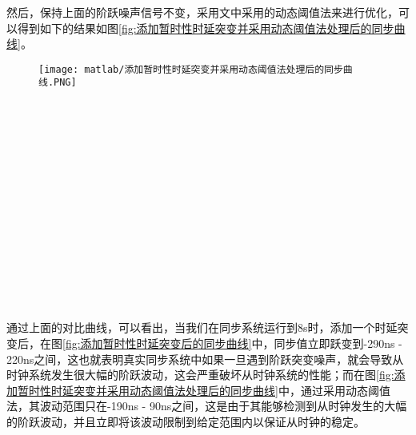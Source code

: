 然后，保持上面的阶跃噪声信号不变，采用文中采用的动态阈值法来进行优化，可以得到如下的结果如图\ref{fig:添加暂时性时延突变并采用动态阈值法处理后的同步曲线}。
\begin{figure}[htbp]
  \centering
  \begin{minipage}[b]{1\textwidth}
    \captionstyle{\centering}
    \centering
    \texttt{[image: matlab/添加暂时性时延突变并采用动态阈值法处理后的同步曲线.PNG]}
  \end{minipage}     
\end{figure}
\\ \\ \\ \\ \\ \\ \\ \\ \\ \\ \\ \\ \\ \\

通过上面的对比曲线，可以看出，当我们在同步系统运行到8s时，添加一个时延突变后，在图\ref{fig:添加暂时性时延突变后的同步曲线}中，同步值立即跃变到-290ns - 220ns之间，这也就表明真实同步系统中如果一旦遇到阶跃突变噪声，就会导致从时钟系统发生很大幅的阶跃波动，这会严重破坏从时钟系统的性能；而在图\ref{fig:添加暂时性时延突变并采用动态阈值法处理后的同步曲线}中，通过采用动态阈值法，其波动范围只在-190ns - 90ns之间，这是由于其能够检测到从时钟发生的大幅的阶跃波动，并且立即将该波动限制到给定范围内以保证从时钟的稳定。

